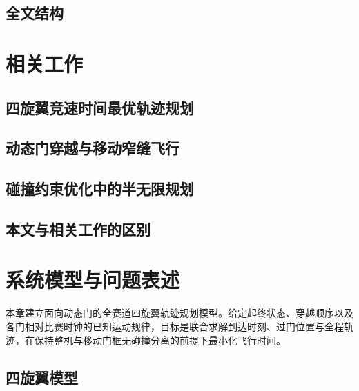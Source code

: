\documentclass[journal]{IEEEtran}
\begin{document}
\subsection{全文结构}

\section{相关工作}

\subsection{四旋翼竞速时间最优轨迹规划}

\subsection{动态门穿越与移动窄缝飞行}

\subsection{碰撞约束优化中的半无限规划}

\subsection{本文与相关工作的区别}

\section{系统模型与问题表述}

本章建立面向动态门的全赛道四旋翼轨迹规划模型。给定起终状态、穿越顺序以及各门相对比赛时钟的已知运动规律，目标是联合求解到达时刻、过门位置与全程轨迹，在保持整机与移动门框无碰撞分离的前提下最小化飞行时间。

\subsection{四旋翼模型}
\end{document}
